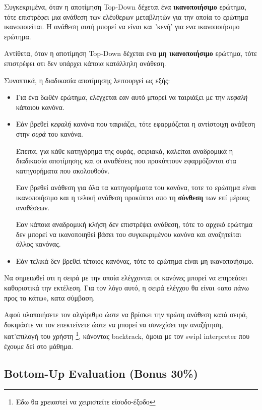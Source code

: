 \documentclass[10pt]{article}
\begin{document}
Συγκεκριμένα, όταν η αποτίμηση Top-Down δέχεται ένα \textbf{ικανοποιήσιμο} ερώτημα, τότε επιστρέφει μια ανάθεση των ελέυθερων μεταβλητών για την οποία το ερώτημα ικανοποιείται. H ανάθεση αυτή μπορεί να είναι και 'κενή' για ενα ικανοποιήσιμο ερώτημα.\


Αντίθετα, όταν η αποτίμηση Top-Down δέχεται ενα \textbf{μη ικανοποιήσιμο} ερώτημα, τότε επιστρέφει οτι δεν υπάρχει κάποια κατάλληλη ανάθεση.\

Συνοπτικά, η διαδικασία αποτίμησης λειτουργεί ως εξής:\

\begin{itemize}
    \item Για ένα δωθέν ερώτημα, ελέγχεται εαν αυτό μπορεί να ταιριάξει με την \textit{κεφαλή} κάποιου κανόνα.\
    \item Εάν βρεθεί \textit{κεφαλή} κανόνα που ταιριάζει, τότε εφαρμόζεται η αντίστοιχη ανάθεση στην \textit{ουρά} του κανόνα.\

    Έπειτα, για κάθε κατηγόρημα της ουράς, σειριακά, καλείται αναδρομικά η διαδικασία αποτίμησης και οι αναθέσεις που προκύπτουν εφαρμόζονται στα κατηγορήματα που ακολουθούν.\

    Εαν βρεθεί ανάθεση για όλα τα κατηγορήματα του κανόνα, τοτε το ερώτημα είναι ικανοποιήσιμο και η τελική ανάθεση προκύπτει απο τη \textbf{σύνθεση} των επί μέρους αναθέσεων.

    Εαν κάποια αναδρομική κλήση δεν επιστρέψει ανάθεση, τότε το αρχικό ερώτημα δεν μπορεί να ικανοποιηθεί βάσει του συγκεκριμένου κανόνα και αναζητείται άλλος κανόνας.\

    \item Εάν τελικά δεν βρεθεί τέτοιος κανόνας, τότε το ερώτημα είναι μη ικανοποιήσιμο. 

\end{itemize}

Να σημειωθεί οτι η σειρά με την οποία ελέγχονται οι κανόνες μπορεί να επηρεάσει καθοριστικά την εκτέλεση. Για τον λόγο αυτό, η σειρά ελέγχου θα είναι «απο πάνω προς τα κάτω», κατα σύμβαση.\

Αφού υλοποιήσετε τον αλγόριθμο ώστε να βρίσκει την πρώτη ανάθεση κατά σειρά, δοκιμάστε να τον επεκτείνετε ώστε να μπορεί να συνεχίσει την αναζήτηση, κατ'επιλογή του χρήστη \footnote{Εδω θα χρειαστεί να χειριστείτε είσοδο-έξοδο}, κάνοντας backtrack, όμοια με τον swipl interpreter που έχουμε δεί στο μάθημα.\



\subsection*{Bottom-Up Evaluation (Bonus 30\%)}
\end{document}
